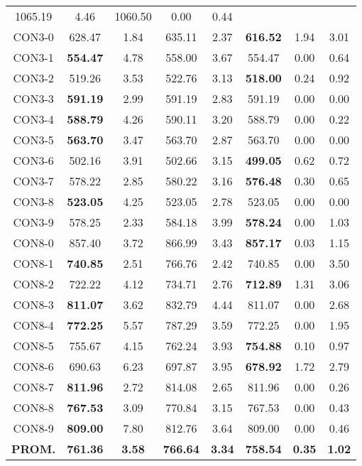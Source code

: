 \begin{table}[h]
\begin{tabular}{c c c c c c c c}
1065.19 & 4.46 & 1060.50 & 0.00
 & 0.44\\CON3-0 & 628.47 & 1.84 & 
635.11 & 2.37 & \bf{616.52} & 
1.94 & 3.01\\CON3-1 & \bf{554.47} & 4.78 & 
558.00 & 3.67 & 554.47 & 0.00
 & 0.64\\CON3-2 & 519.26 & 3.53 & 
522.76 & 3.13 & \bf{518.00} & 
0.24 & 0.92\\CON3-3 & \bf{591.19} & 2.99 & 
591.19 & 2.83 & 591.19 & 0.00
 & 0.00\\
CON3-4 & \bf{588.79} & 4.26 & 
590.11 & 3.20 & 588.79 & 0.00
 & 0.22\\CON3-5 & \bf{563.70} & 3.47 & 
563.70 & 2.87 & 563.70 & 0.00
 & 0.00\\
CON3-6 & 502.16 & 3.91 & 
502.66 & 3.15 & \bf{499.05} & 
0.62 & 0.72\\CON3-7 & 578.22 & 2.85 & 
580.22 & 3.16 & \bf{576.48} & 
0.30 & 0.65\\CON3-8 & \bf{523.05} & 4.25 & 
523.05 & 2.78 & 523.05 & 0.00
 & 0.00\\
CON3-9 & 578.25 & 2.33 & 
584.18 & 3.99 & \bf{578.24} & 
0.00 & 1.03\\CON8-0 & 857.40 & 3.72 & 
866.99 & 3.43 & \bf{857.17} & 
0.03 & 1.15\\CON8-1 & \bf{740.85} & 2.51 & 
766.76 & 2.42 & 740.85 & 0.00
 & 3.50\\CON8-2 & 722.22 & 4.12 & 
734.71 & 2.76 & \bf{712.89} & 
1.31 & 3.06\\CON8-3 & \bf{811.07} & 3.62 & 
832.79 & 4.44 & 811.07 & 0.00
 & 2.68\\CON8-4 & \bf{772.25} & 5.57 & 
787.29 & 3.59 & 772.25 & 0.00
 & 1.95\\CON8-5 & 755.67 & 4.15 & 
762.24 & 3.93 & \bf{754.88} & 
0.10 & 0.97\\CON8-6 & 690.63 & 6.23 & 
697.87 & 3.95 & \bf{678.92} & 
1.72 & 2.79\\CON8-7 & \bf{811.96} & 2.72 & 
814.08 & 2.65 & 811.96 & 0.00
 & 0.26\\CON8-8 & \bf{767.53} & 3.09 & 
770.84 & 3.15 & 767.53 & 0.00
 & 0.43\\CON8-9 & \bf{809.00} & 7.80 & 
812.76 & 3.64 & 809.00 & 0.00
 & 0.46\\\bf{PROM.} & 
\bf{761.36} & \bf{3.58} & \bf{766.64} & \bf{3.34} & \bf{758.54} & \bf{0.35} & \bf{1.02}\\[1ex]\hline
\end{tabular}
\label{table:nonlin}
\end{table}
